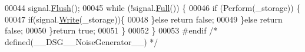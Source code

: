 \begin{DoxyCode}
00044         signal.\hyperlink{class_d_s_g_1_1_ring_buffer_ab23c8003d2857809a816068eeb209d60}{Flush}();
00045         \textcolor{keywordflow}{while} (!signal.\hyperlink{class_d_s_g_1_1_ring_buffer_a53ddb04ffcbb5470a8d2b0a3c65b70cb}{Full}()) \{
00046             \textcolor{keywordflow}{if} (Perform(\_storage)) \{
00047                 \textcolor{keywordflow}{if}(signal.\hyperlink{class_d_s_g_1_1_ring_buffer_aa5dd2caa0a270173251faee40a43d692}{Write}(\_storage))\{
00048                 \}\textcolor{keywordflow}{else} \textcolor{keywordflow}{return} \textcolor{keyword}{false};
00049             \}\textcolor{keywordflow}{else} \textcolor{keywordflow}{return} \textcolor{keyword}{false};
00050         \}\textcolor{keywordflow}{return} \textcolor{keyword}{true};
00051     \}
00052 \}
00053 \textcolor{preprocessor}{#endif }\textcolor{comment}{/* defined(\_\_DSG\_\_NoiseGenerator\_\_) */}\textcolor{preprocessor}{}
\end{DoxyCode}

